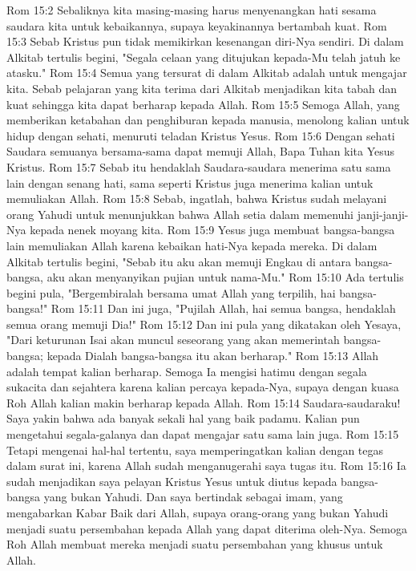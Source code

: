 Rom 15:2  Sebaliknya kita masing-masing harus menyenangkan hati sesama saudara kita untuk kebaikannya, supaya keyakinannya bertambah kuat.
Rom 15:3  Sebab Kristus pun tidak memikirkan kesenangan diri-Nya sendiri. Di dalam Alkitab tertulis begini, "Segala celaan yang ditujukan kepada-Mu telah jatuh ke atasku."
Rom 15:4  Semua yang tersurat di dalam Alkitab adalah untuk mengajar kita. Sebab pelajaran yang kita terima dari Alkitab menjadikan kita tabah dan kuat sehingga kita dapat berharap kepada Allah.
Rom 15:5  Semoga Allah, yang memberikan ketabahan dan penghiburan kepada manusia, menolong kalian untuk hidup dengan sehati, menuruti teladan Kristus Yesus.
Rom 15:6  Dengan sehati Saudara semuanya bersama-sama dapat memuji Allah, Bapa Tuhan kita Yesus Kristus.
Rom 15:7  Sebab itu hendaklah Saudara-saudara menerima satu sama lain dengan senang hati, sama seperti Kristus juga menerima kalian untuk memuliakan Allah.
Rom 15:8  Sebab, ingatlah, bahwa Kristus sudah melayani orang Yahudi untuk menunjukkan bahwa Allah setia dalam memenuhi janji-janji-Nya kepada nenek moyang kita.
Rom 15:9  Yesus juga membuat bangsa-bangsa lain memuliakan Allah karena kebaikan hati-Nya kepada mereka. Di dalam Alkitab tertulis begini, "Sebab itu aku akan memuji Engkau di antara bangsa-bangsa, aku akan menyanyikan pujian untuk nama-Mu."
Rom 15:10  Ada tertulis begini pula, "Bergembiralah bersama umat Allah yang terpilih, hai bangsa-bangsa!"
Rom 15:11  Dan ini juga, "Pujilah Allah, hai semua bangsa, hendaklah semua orang memuji Dia!"
Rom 15:12  Dan ini pula yang dikatakan oleh Yesaya, "Dari keturunan Isai akan muncul seseorang yang akan memerintah bangsa-bangsa; kepada Dialah bangsa-bangsa itu akan berharap."
Rom 15:13  Allah adalah tempat kalian berharap. Semoga Ia mengisi hatimu dengan segala sukacita dan sejahtera karena kalian percaya kepada-Nya, supaya dengan kuasa Roh Allah kalian makin berharap kepada Allah.
Rom 15:14  Saudara-saudaraku! Saya yakin bahwa ada banyak sekali hal yang baik padamu. Kalian pun mengetahui segala-galanya dan dapat mengajar satu sama lain juga.
Rom 15:15  Tetapi mengenai hal-hal tertentu, saya memperingatkan kalian dengan tegas dalam surat ini, karena Allah sudah menganugerahi saya tugas itu.
Rom 15:16  Ia sudah menjadikan saya pelayan Kristus Yesus untuk diutus kepada bangsa-bangsa yang bukan Yahudi. Dan saya bertindak sebagai imam, yang mengabarkan Kabar Baik dari Allah, supaya orang-orang yang bukan Yahudi menjadi suatu persembahan kepada Allah yang dapat diterima oleh-Nya. Semoga Roh Allah membuat mereka menjadi suatu persembahan yang khusus untuk Allah.
